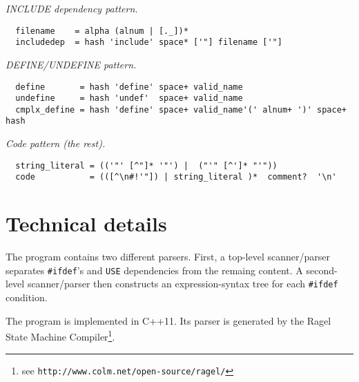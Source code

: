 \documentclass[DIV16]{scrartcl}
\begin{document}
\noindent\emph{INCLUDE dependency pattern.}

{\small\begin{verbatim}
  filename    = alpha (alnum | [._])* 
  includedep  = hash 'include' space* ['"] filename ['"]
\end{verbatim}}

\noindent\emph{DEFINE/UNDEFINE pattern.}

{\small\begin{verbatim}
  define       = hash 'define' space+ valid_name
  undefine     = hash 'undef'  space+ valid_name
  cmplx_define = hash 'define' space+ valid_name'(' alnum+ ')' space+ hash 
\end{verbatim}}

\noindent\emph{Code pattern (the rest).}

{\small\begin{verbatim}
  string_literal = (('"' [^"]* '"') |  ("'" [^']* "'"))
  code           = (([^\n#!'"]) | string_literal )*  comment?  '\n'
\end{verbatim}}


\section{Technical details}

The program contains two different parsers. First, a top-level
scanner/parser separates \texttt{\#ifdef}'s and \texttt{USE}
dependencies from the remaing content. A second-level scanner/parser
then constructs an expression-syntax tree for each \texttt{\#ifdef}
condition.

The program is implemented in C++11. Its parser is generated by the
Ragel State Machine Compiler\footnote{see \texttt{http://www.colm.net/open-source/ragel/}}.
\end{document}
